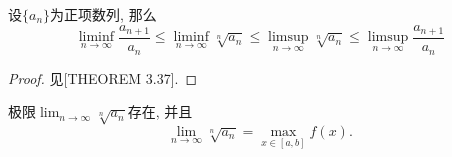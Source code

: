 \documentclass[a4paper,12pt]{ctexart}
\newcommand{\maxf}{\max_{x\in[a,b]}{f(x)}}
\begin{document}
    \begin{lemma}
        \label{rudin}
        设$\{a_n\}$为正项数列, 那么
        \begin{equation}
            \liminf_{n\to\infty}{\frac{a_{n+1}}{a_n}}
            \leq\liminf_{n\to\infty}{\sqrt[n]{a_n}}
            \leq\limsup_{n\to\infty}{\sqrt[n]{a_n}}
            \leq\limsup_{n\to\infty}{\frac{a_{n+1}}{a_n}}
        \end{equation}
    \end{lemma}

    \begin{proof}
        见\citep{rudin_pma}[THEOREM 3.37].
    \end{proof}

    \begin{theorem}
        \label{sqrt_limit}
        极限$\displaystyle\lim_{n\to\infty}\sqrt[n]{a_n}$存在, 并且
        \begin{equation}
            \lim_{n\to\infty}\sqrt[n]{a_n}=\maxf.
        \end{equation}
    \end{theorem}
\end{document}
